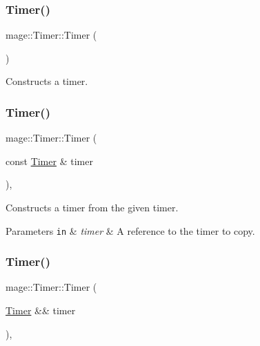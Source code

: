 \subsubsection{\texorpdfstring{Timer()}{Timer()}\hspace{0.1cm}{\footnotesize\ttfamily [1/3]}}
{\footnotesize\ttfamily mage\+::\+Timer\+::\+Timer (\begin{DoxyParamCaption}{ }\end{DoxyParamCaption})\hspace{0.3cm}{\ttfamily [noexcept]}}

Constructs a timer. \hypertarget{classmage_1_1_timer_ae792c5a546deb35e5e65ed7fe6a8d281}{}\label{classmage_1_1_timer_ae792c5a546deb35e5e65ed7fe6a8d281} 
\subsubsection{\texorpdfstring{Timer()}{Timer()}\hspace{0.1cm}{\footnotesize\ttfamily [2/3]}}
{\footnotesize\ttfamily mage\+::\+Timer\+::\+Timer (\begin{DoxyParamCaption}\item[{const \hyperlink{classmage_1_1_timer}{Timer} \&}]{timer }\end{DoxyParamCaption})\hspace{0.3cm}{\ttfamily [default]}, {\ttfamily [noexcept]}}

Constructs a timer from the given timer.


\begin{DoxyParams}[1]{Parameters}
\mbox{\tt in}  & {\em timer} & A reference to the timer to copy. \\
\hline
\end{DoxyParams}
\hypertarget{classmage_1_1_timer_a9fde919b6040a044748e98f59e18bece}{}\label{classmage_1_1_timer_a9fde919b6040a044748e98f59e18bece} 
\subsubsection{\texorpdfstring{Timer()}{Timer()}\hspace{0.1cm}{\footnotesize\ttfamily [3/3]}}
{\footnotesize\ttfamily mage\+::\+Timer\+::\+Timer (\begin{DoxyParamCaption}\item[{\hyperlink{classmage_1_1_timer}{Timer} \&\&}]{timer }\end{DoxyParamCaption})\hspace{0.3cm}{\ttfamily [default]}, {\ttfamily [noexcept]}}

